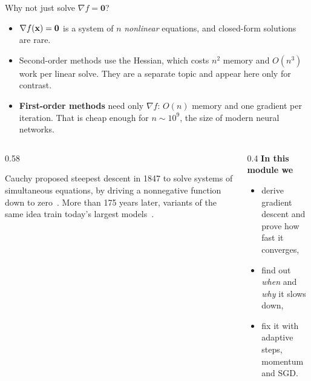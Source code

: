 \begin{frame}{Why not just solve $\nabla f = \mathbf 0$?}
  \begin{itemize}\small
    \item $\nabla f(\mathbf{x}) = \mathbf 0$ is a system of $n$ \emph{nonlinear} equations, and closed-form solutions are rare.
    \item Second-order methods use the Hessian, which costs $n^2$ memory and $O(n^3)$ work per linear solve.
          They are a separate topic and appear here only for contrast.
    \item \textbf{First-order methods} need only $\nabla f$: $O(n)$ memory and one gradient per iteration.
          That is cheap enough for $n\sim10^9$, the size of modern neural networks.
  \end{itemize}

  \vspace{4pt}
  \begin{columns}[T]
    \begin{column}{0.58\textwidth}
      \begin{keybox}
        \small Cauchy proposed steepest descent in 1847 to solve systems of simultaneous equations,
        by driving a nonnegative function down to zero~\cite{cauchy1847}. More than 175 years later,
        variants of the same idea train today's largest models~\cite{bottou2018}.
      \end{keybox}
    \end{column}
    \begin{column}{0.4\textwidth}
      \small
      \textbf{In this module we}
      \begin{itemize}\footnotesize
        \item derive gradient descent and prove how fast it converges,
        \item find out \emph{when} and \emph{why} it slows down,
        \item fix it with adaptive steps, momentum and SGD.
      \end{itemize}
    \end{column}
  \end{columns}
\end{frame}
